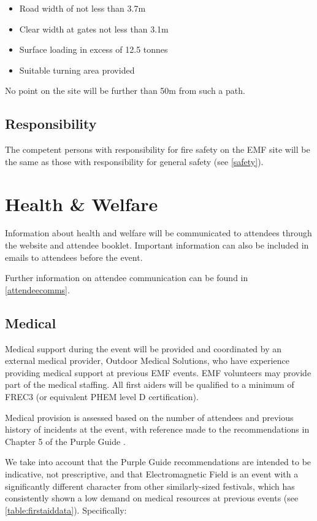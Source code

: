 \begin{itemize}
    \tightlist
    \item Road width of not less than 3.7m
    \item Clear width at gates not less than 3.1m
    \item Surface loading in excess of 12.5 tonnes
    \item Suitable turning area provided
\end{itemize}

No point on the site will be further than 50m from such a path.

\subsection{Responsibility}
The competent persons with responsibility for fire safety on the EMF site will be the same
as those with responsibility for general safety (see \cref{safety}).

\newpage
\section{Health \& Welfare}
\label{healthwelfare}

Information about health and welfare will be communicated to attendees through the website
and attendee booklet. Important information can also be included in emails to attendees
before the event.

Further information on attendee communication can be found in \cref{attendeecomms}.

\subsection{Medical}

Medical support during the event will be provided and coordinated by an external medical provider,
Outdoor Medical Solutions, who have experience providing medical support at previous EMF events. EMF
volunteers may provide part of the medical staffing. All first aiders will be qualified to a
minimum of FREC3 (or equivalent PHEM level D certification).

Medical provision is assessed based on the number of attendees and previous history of incidents
at the event, with reference made to the recommendations in Chapter 5 of the Purple Guide \cite{purpleguide}.

We take into account that the Purple Guide recommendations are intended to be indicative, not
prescriptive, and that Electromagnetic Field is an event with a significantly different character
from other similarly-sized festivals, which has consistently shown a low demand on medical resources
at previous events (see \cref{table:firstaiddata}). Specifically:

